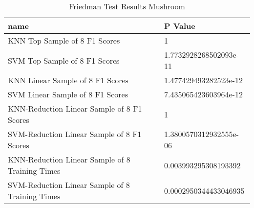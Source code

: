 \begin{table}
\centering
\caption{Friedman Test Results Mushroom}
\label{tab:friedman_test_results_mushroom}
\begin{tabular}{ll}
\toprule
name & P Value \\
\midrule
KNN Top Sample of 8 F1 Scores & 1 \\
SVM Top Sample of 8 F1 Scores & 1.7732928268502093e-11 \\
KNN Linear Sample of 8 F1 Scores & 1.477429493282523e-12 \\
SVM Linear Sample of 8 F1 Scores & 7.435065423603964e-12 \\
KNN-Reduction Linear Sample of 8 F1 Scores & 1 \\
SVM-Reduction Linear Sample of 8 F1 Scores & 1.3800570312932555e-06 \\
KNN-Reduction Linear Sample of 8 Training Times & 0.003993295308193392 \\
SVM-Reduction Linear Sample of 8 Training Times & 0.0002950344433046935 \\
\bottomrule
\end{tabular}
\end{table}
